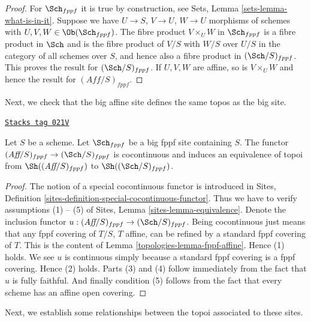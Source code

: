 \begin{proof}
For $\Sch_{fppf}$ it is true by construction, see
Sets, Lemma \ref{sets-lemma-what-is-in-it}.
Suppose we have $U \to S$, $V \to U$, $W \to U$ morphisms
of schemes with $U, V, W \in \Ob(\Sch_{fppf})$.
The fibre product $V \times_U W$ in $\Sch_{fppf}$
is a fibre product in $\Sch$ and
is the fibre product of $V/S$ with $W/S$ over $U/S$ in
the category of all schemes over $S$, and hence also a
fibre product in $(\Sch/S)_{fppf}$.
This proves the result for $(\Sch/S)_{fppf}$.
If $U, V, W$ are affine, so is $V \times_U W$ and hence the
result for $(\textit{Aff}/S)_{fppf}$.
\end{proof}

Next, we check that the big affine site defines the same
topos as the big site.

\begin{lemma}
\label{topologies-lemma-affine-big-site-fppf}
\href{https://stacks.math.columbia.edu/tag/021V}{\texttt{Stacks tag 021V}}

Let $S$ be a scheme. Let $\Sch_{fppf}$ be a big fppf
site containing $S$.
The functor $(\textit{Aff}/S)_{fppf} \to (\Sch/S)_{fppf}$
is cocontinuous and induces an equivalence of topoi from
$\Sh((\textit{Aff}/S)_{fppf})$ to
$\Sh((\Sch/S)_{fppf})$.
\end{lemma}

\begin{proof}

The notion of a special cocontinuous functor is introduced in
Sites, Definition \ref{sites-definition-special-cocontinuous-functor}.
Thus we have to verify assumptions (1) -- (5) of
Sites, Lemma \ref{sites-lemma-equivalence}.
Denote the inclusion functor
$u : (\textit{Aff}/S)_{fppf} \to (\Sch/S)_{fppf}$.
Being cocontinuous just means that any fppf covering of
$T/S$, $T$ affine, can be refined by a standard fppf covering of $T$.
This is the content of
Lemma \ref{topologies-lemma-fppf-affine}.
Hence (1) holds. We see $u$ is continuous simply because a standard
fppf covering is a fppf covering. Hence (2) holds.
Parts (3) and (4) follow immediately from the fact that $u$ is
fully faithful. And finally condition (5) follows from the
fact that every scheme has an affine open covering.
\end{proof}

Next, we establish some relationships between the topoi
associated to these sites.

